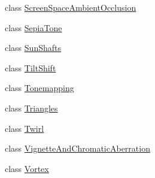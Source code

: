 \begin{DoxyCompactItemize}
\item 
class \hyperlink{class_unity_standard_assets_1_1_image_effects_1_1_screen_space_ambient_occlusion}{Screen\+Space\+Ambient\+Occlusion}
\item 
class \hyperlink{class_unity_standard_assets_1_1_image_effects_1_1_sepia_tone}{Sepia\+Tone}
\item 
class \hyperlink{class_unity_standard_assets_1_1_image_effects_1_1_sun_shafts}{Sun\+Shafts}
\item 
class \hyperlink{class_unity_standard_assets_1_1_image_effects_1_1_tilt_shift}{Tilt\+Shift}
\item 
class \hyperlink{class_unity_standard_assets_1_1_image_effects_1_1_tonemapping}{Tonemapping}
\item 
class \hyperlink{class_unity_standard_assets_1_1_image_effects_1_1_triangles}{Triangles}
\item 
class \hyperlink{class_unity_standard_assets_1_1_image_effects_1_1_twirl}{Twirl}
\item 
class \hyperlink{class_unity_standard_assets_1_1_image_effects_1_1_vignette_and_chromatic_aberration}{Vignette\+And\+Chromatic\+Aberration}
\item 
class \hyperlink{class_unity_standard_assets_1_1_image_effects_1_1_vortex}{Vortex}
\end{DoxyCompactItemize}
